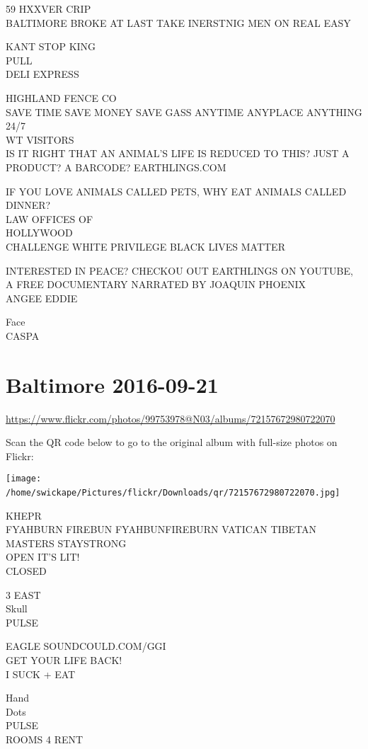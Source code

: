 \documentclass[10pt,letterpaper]{article}
\begin{document}
59 HXXVER CRIP\\
BALTIMORE BROKE AT LAST TAKE INERSTNIG MEN ON REAL EASY

KANT STOP KING\\
PULL\\
DELI EXPRESS

HIGHLAND FENCE CO\\
SAVE TIME SAVE MONEY SAVE GASS ANYTIME ANYPLACE ANYTHING 24/7\\
WT VISITORS\\
IS IT RIGHT THAT AN ANIMAL'S LIFE IS REDUCED TO THIS?  JUST A PRODUCT?  A BARCODE?  EARTHLINGS.COM

IF YOU LOVE ANIMALS CALLED PETS, WHY EAT ANIMALS CALLED DINNER?\\
LAW OFFICES OF\\
HOLLYWOOD\\
CHALLENGE WHITE PRIVILEGE BLACK LIVES MATTER

INTERESTED IN PEACE?  CHECKOU OUT EARTHLINGS ON YOUTUBE, A FREE DOCUMENTARY NARRATED BY JOAQUIN PHOENIX\\
ANGEE EDDIE

Face\\
CASPA
\

\section*{Baltimore 2016-09-21}

\url{https://www.flickr.com/photos/99753978@N03/albums/72157672980722070}

Scan the QR code below to go to the original album with full-size photos on Flickr:

\texttt{[image: /home/swickape/Pictures/flickr/Downloads/qr/72157672980722070.jpg]}
\

KHEPR\\
FYAHBURN FIREBUN FYAHBUNFIREBURN VATICAN TIBETAN MASTERS STAYSTRONG\\
OPEN IT'S LIT!\\
CLOSED

3 EAST\\
Skull\\
PULSE

EAGLE SOUNDCOULD.COM/GGI\\
GET YOUR LIFE BACK!\\
I SUCK + EAT

Hand\\
Dots\\
PULSE\\
ROOMS 4 RENT
\end{document}
